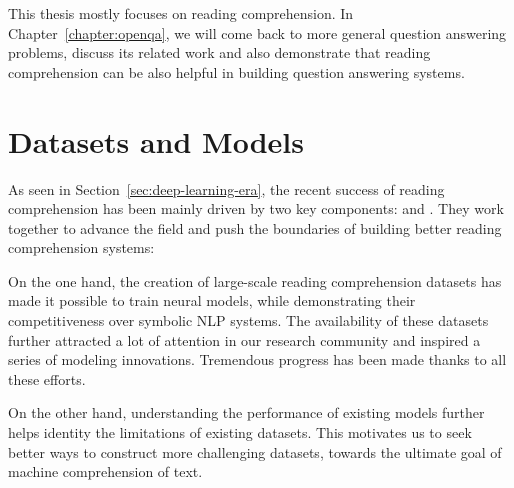 This thesis mostly focuses on reading comprehension. In Chapter~\ref{chapter:openqa}, we will come back to more general question answering problems, discuss its related work and also demonstrate that reading comprehension can be also helpful in building question answering systems.

\section{Datasets and Models}
\label{sec:rc-drive}


As seen in Section~\ref{sec:deep-learning-era}, the recent success of reading comprehension has been mainly driven by two key components:  and . They work together to advance the field and push the boundaries of building better reading comprehension systems:

\begin{description}
\item
On the one hand, the creation of large-scale reading comprehension datasets has made it possible to train neural models, while demonstrating their competitiveness over symbolic NLP systems. The availability of these datasets further attracted a lot of attention in our research community and inspired a series of modeling innovations. Tremendous progress has been made thanks to all these efforts.
\item
On the other hand, understanding the performance of existing models further helps identity the limitations of existing datasets. This motivates us to seek better ways to construct more challenging datasets, towards the ultimate goal of machine comprehension of text.
\end{description}



